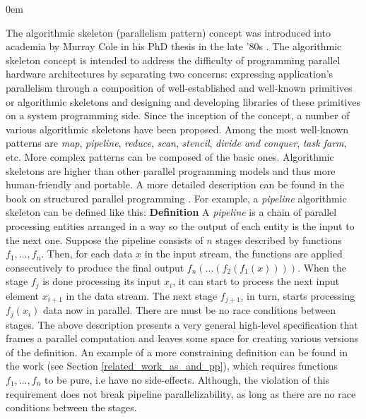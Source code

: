 \begin{description}[style=unboxed,leftmargin=0cm,noitemsep]
\itemsep0em
\item[Algorithmic skeletons or Parallelism Patterns] The algorithmic skeleton (parallelism pattern) concept was introduced into academia by Murray Cole in his PhD thesis in the late ’80s \cite{mcole-thesis}. The algorithmic skeleton concept is intended to address the difficulty of programming parallel hardware architectures by separating two concerns: expressing application's parallelism through a composition of well-established and well-known primitives or algorithmic skeletons and designing and developing libraries of these primitives on a system programming side. Since the inception of the concept, a number of various algorithmic skeletons have been proposed. Among the most well-known patterns are \textit{map}, \textit{pipeline}, \textit{reduce}, \textit{scan}, \textit{stencil}, \textit{divide and conquer}, \textit{task farm}, etc. More complex patterns can be composed of the basic ones. Algorithmic skeletons are higher than other parallel programming models and thus more human-friendly and portable. A more detailed description can be found in the book on structured parallel programming \cite{mccool-patterns}. For example, a \textit{pipeline} algorithmic skeleton can be defined like this:\newline\null
\textbf{Definition} A \textit{pipeline} is a chain of parallel processing entities arranged in a way so the output of each entity is the input to the next one. Suppose the pipeline consists of $n$ stages described by functions $f_{1},...,f_{n}$. Then, for each data $x$ in the input stream, the functions are applied consecutively to produce the final output $f_{n}(...(f_{2}(f_{1}(x))))$. When the stage $f_{j}$ is done processing its input $x_{i}$, it can start to process the next input element $x_{i+1}$ in the data stream. The next stage $f_{j+1}$, in turn, starts processing $f_{j}(x_{i})$ data now in parallel. There are must be no race conditions between stages.\newline\null
\quad The above description presents a very general high-level specification that frames a parallel computation and leaves some space for creating various versions of the definition. An example of a more constraining definition can be found in the work \cite{skeletons-static} (see Section \ref{related_work_as_and_pp}), which requires functions $f_{1},...,f_{n}$ to be pure, i.e have no side-effects. Although, the violation of this requirement does not break pipeline parallelizability, as long as there are no race conditions between the stages.

\end{description}
